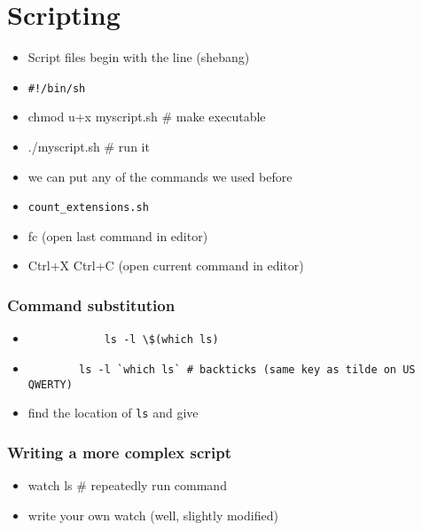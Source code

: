 \documentclass[%
        hyperref={%
                pdfauthor={Zakariyya Mughal},%
                pdfpagemode={None},pdfpagelayout={SinglePage}}%
        xcolor={x11names},%
]{beamer}
\begin{document}
\section{Scripting}\frame{\insertsection}
\begin{frame}[fragile]
	\begin{itemize}
		\item Script files begin with the line (shebang)
		\item
\begin{lstlisting}
#!/bin/sh
\end{lstlisting}
	\item chmod u+x myscript.sh \# make executable
	\item ./myscript.sh \# run it
	\end{itemize}
\end{frame}
\begin{frame}[fragile]
	\begin{itemize}
		\item we can put any of the commands we used
			before
		\item \texttt{count\_extensions.sh}
		\item fc (open last command in editor)
		\item Ctrl+X Ctrl+C (open current command in editor)
	\end{itemize}
\end{frame}
\begin{frame}[fragile]
	\frametitle{Command substitution}
	\begin{itemize}
		\item
		\begin{lstlisting}
			ls -l \$(which ls)
		\end{lstlisting}
		\item 
		\begin{lstlisting}
		ls -l `which ls` # backticks (same key as tilde on US QWERTY)
		\end{lstlisting}
	\item find the location of \texttt{ls} and give
	\end{itemize}
\end{frame}
\begin{frame}[fragile]
	\frametitle{Writing a more complex script}
	\begin{itemize}
		\item watch ls \# repeatedly run command
		\pause\item write your own watch (well, slightly
			modified)
	\end{itemize}
\end{frame}
\end{document}
